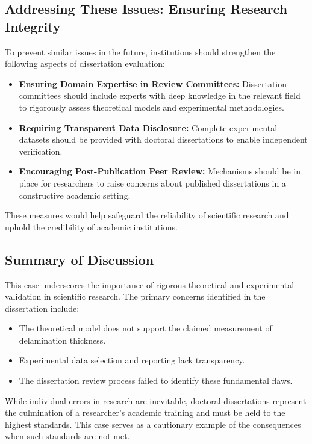 \documentclass[10pt,twocolumn]{article}
\begin{document}
\subsection{Addressing These Issues: Ensuring Research Integrity}

To prevent similar issues in the future, institutions should strengthen the following aspects of dissertation evaluation:

\begin{itemize}
    \item \textbf{Ensuring Domain Expertise in Review Committees:} Dissertation committees should include experts with deep knowledge in the relevant field to rigorously assess theoretical models and experimental methodologies.
    \item \textbf{Requiring Transparent Data Disclosure:} Complete experimental datasets should be provided with doctoral dissertations to enable independent verification.
    \item \textbf{Encouraging Post-Publication Peer Review:} Mechanisms should be in place for researchers to raise concerns about published dissertations in a constructive academic setting.
\end{itemize}

These measures would help safeguard the reliability of scientific research and uphold the credibility of academic institutions.

\subsection{Summary of Discussion}

This case underscores the importance of rigorous theoretical and experimental validation in scientific research. The primary concerns identified in the dissertation include:
\begin{itemize}
    \item The theoretical model does not support the claimed measurement of delamination thickness.
    \item Experimental data selection and reporting lack transparency.
    \item The dissertation review process failed to identify these fundamental flaws.
\end{itemize}

While individual errors in research are inevitable, doctoral dissertations represent the culmination of a researcher’s academic training and must be held to the highest standards. This case serves as a cautionary example of the consequences when such standards are not met.
\end{document}
